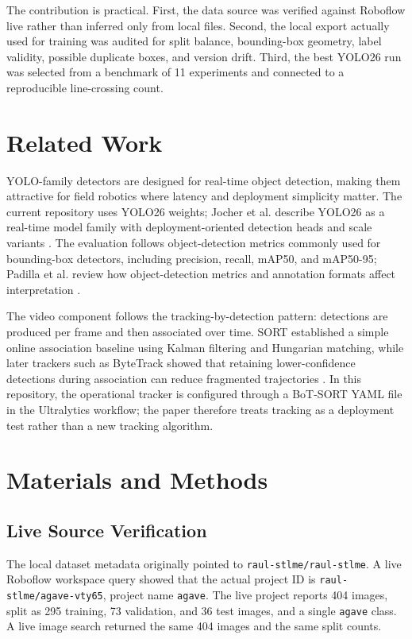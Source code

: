 \documentclass[10pt,twocolumn]{article}
\begin{document}
The contribution is practical. First, the data source was verified against Roboflow live rather than inferred only from local files. Second, the local export actually used for training was audited for split balance, bounding-box geometry, label validity, possible duplicate boxes, and version drift. Third, the best YOLO26 run was selected from a benchmark of 11 experiments and connected to a reproducible line-crossing count.

\section{Related Work}

YOLO-family detectors are designed for real-time object detection, making them attractive for field robotics where latency and deployment simplicity matter. The current repository uses YOLO26 weights; Jocher et al. describe YOLO26 as a real-time model family with deployment-oriented detection heads and scale variants \cite{jocher2026}. The evaluation follows object-detection metrics commonly used for bounding-box detectors, including precision, recall, mAP50, and mAP50-95; Padilla et al. review how object-detection metrics and annotation formats affect interpretation \cite{padilla2021}.

The video component follows the tracking-by-detection pattern: detections are produced per frame and then associated over time. SORT established a simple online association baseline using Kalman filtering and Hungarian matching, while later trackers such as ByteTrack showed that retaining lower-confidence detections during association can reduce fragmented trajectories \cite{bewley2016,zhang2022}. In this repository, the operational tracker is configured through a BoT-SORT YAML file in the Ultralytics workflow; the paper therefore treats tracking as a deployment test rather than a new tracking algorithm.

\section{Materials and Methods}

\subsection{Live Source Verification}

The local dataset metadata originally pointed to \texttt{raul-stlme/raul-stlme}. A live Roboflow workspace query showed that the actual project ID is \texttt{raul-stlme/agave-vty65}, project name \texttt{agave}. The live project reports 404 images, split as 295 training, 73 validation, and 36 test images, and a single \texttt{agave} class. A live image search returned the same 404 images and the same split counts.
\end{document}
